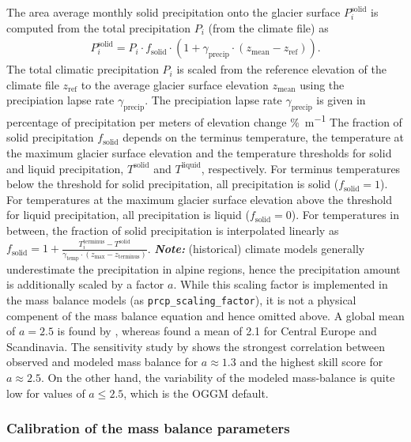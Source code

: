         The area average monthly solid precipitation onto the glacier surface $P_i^\text{solid}$ is computed from the total precipitation $P_i$ (from the climate file) as
        \begin{align}
            P_i^\text{solid} = P_i \cdot f_\text{solid} \cdot (1 + \gamma_\text{precip} \cdot (z_\text{mean} - z_\text{ref})).
        \end{align}
        The total climatic precipitation $P_i$ is scaled from the reference elevation of the climate file $z_\text{ref}$ to the average glacier surface elevation $z_\text{mean}$ using the precipiation lapse rate $\gamma_\text{precip}$. The precipiation lapse rate $\gamma_\text{precip}$ is given in percentage of precipitation per meters of elevation change \si{\percent\per\meter} The fraction of solid precipitation $f_\text{solid}$ depends on the terminus temperature, the temperature at the maximum glacier surface elevation and the temperature thresholds for solid and liquid precipitation, $T^\text{solid}$ and $T^\text{liquid}$, respectively. For terminus temperatures below the threshold for solid precipitation, all precipitation is solid ($f_\text{solid} = 1$). For temperatures at the maximum glacier surface elevation above the threshold for liquid precipitation, all precipitation is liquid ($f_\text{solid} = 0$). For temperatures in between, the fraction of solid precipitation is interpolated linearly as $f_\text{solid} = 1 + \frac{T_{i}^\text{terminus} - T^\text{solid}}{\gamma_\text{temp}\cdot(z_\text{max} - z_\text{terminus})}$.
        \textit{\textbf{Note:}} (historical) climate models generally underestimate the precipitation in alpine regions, hence the precipitation amount is additionally scaled by a factor $a$. While this scaling factor is implemented in the mass balance models (as \lstinline`prcp_scaling_factor`), it is not a physical compenent of the  mass balance equation and hence omitted above. A global mean of $a = 2.5$ is found by \citet{Giesen2012}, whereas \citet{Marzeion2012c} found a mean of 2.1 for Central Europe and Scandinavia. The sensitivity study by \citet{Marzeion2012b} shows the strongest correlation between observed and modeled mass balance for $a \approx 1.3$ and the highest skill score for $a \approx 2.5$. On the other hand, the variability of the modeled mass-balance is quite low for values of $a \leq 2.5$, which is the OGGM default.

        \subsubsection*{Calibration of the mass balance parameters}\label{ssub:mb-calib}


